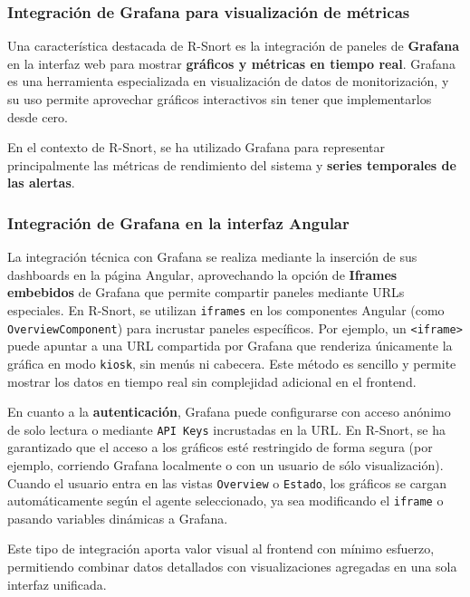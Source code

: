 \documentclass[11pt,a4paper,twoside]{report}
\begin{document}
\subsubsection{Integración de Grafana para visualización de métricas}

Una característica destacada de R-Snort es la integración de paneles de \textbf{Grafana} en la interfaz web para mostrar \textbf{gráficos y métricas en tiempo real}. Grafana es una herramienta especializada en visualización de datos de monitorización, y su uso permite aprovechar gráficos interactivos sin tener que implementarlos desde cero.\newline

En el contexto de R-Snort, se ha utilizado Grafana para representar principalmente las métricas de rendimiento del sistema y \textbf{series temporales de las alertas}.

\subsubsection{Integración de Grafana en la interfaz Angular}

La integración técnica con Grafana se realiza mediante la inserción de sus dashboards en la página Angular, aprovechando la opción de \textbf{Iframes embebidos} de Grafana que permite compartir paneles mediante URLs especiales. En R-Snort, se utilizan \texttt{iframes} en los componentes Angular (como \texttt{OverviewComponent}) para incrustar paneles específicos. Por ejemplo, un \texttt{<iframe>} puede apuntar a una URL compartida por Grafana que renderiza únicamente la gráfica en modo \texttt{kiosk}, sin menús ni cabecera. Este método es sencillo y permite mostrar los datos en tiempo real sin complejidad adicional en el frontend.\newline

En cuanto a la \textbf{autenticación}, Grafana puede configurarse con acceso anónimo de solo lectura o mediante \texttt{API Keys} incrustadas en la URL. En R-Snort, se ha garantizado que el acceso a los gráficos esté restringido de forma segura (por ejemplo, corriendo Grafana localmente o con un usuario de sólo visualización). Cuando el usuario entra en las vistas \texttt{Overview} o \texttt{Estado}, los gráficos se cargan automáticamente según el agente seleccionado, ya sea modificando el \texttt{iframe} o pasando variables dinámicas a Grafana.\newline

Este tipo de integración aporta valor visual al frontend con mínimo esfuerzo, permitiendo combinar datos detallados con visualizaciones agregadas en una sola interfaz unificada.
\end{document}
